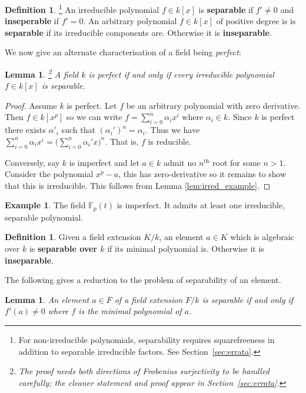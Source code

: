 \documentclass[12pt]{article}
\theoremstyle{plain}
\newtheorem{lemma}[thm]{Lemma}
\theoremstyle{definition}
\newtheorem{defn}[thm]{Definition} %
\newtheorem{example}[thm]{Example}
\newcommand{\bb}[1]{\mathbb{#1}}
\begin{document}
\begin{defn}\label{def:separable_irred_poly}\footnote{For non-irreducible polynomials, separability requires squarefreeness in addition to separable irreducible factors. See Section~\ref{sec:errata}.}
An irreducible polynomial $f \in k[x]$ is \textbf{separable} if $f' \neq 0$ and \textbf{inseperable} if $f' = 0$. An arbitrary polynomial $f \in k[x]$ of positive degree is is \textbf{separable} if its irreducible components are. Otherwise it is \textbf{inseparable}. 
\end{defn}
We now give an alternate characterisation of a field being \emph{perfect}:
\begin{lemma}
\label{lem:perf_alt_defn}\footnote{The proof needs both directions of Frobenius surjectivity to be handled carefully; the cleaner statement and proof appear in Section~\ref{sec:errata}.}
A field $k$ is perfect if and only if every irreducible polynomial $f \in k[x]$ is separable.
\end{lemma}
\begin{proof}
Assume $k$ is perfect. Let $f$ be an arbitrary polynomial with zero derivative. Then $f \in k[x^p]$ so we can write $f = \sum_{i = 0}^n \alpha_i x^i$ where $\alpha_i \in k$. Since $k$ is perfect there exists $\alpha'_i$ such that $(\alpha_i')^n = \alpha_i$. Thus we have $\sum_{i = 0}^n \alpha_i x^i = \big(\sum_{i = 0}^n \alpha_i' x\big)^n$. That is, $f$ is reducible.

Conversely, say $k$ is imperfect and let $a \in k$ admit no $n^\text{th}$ root for some $n > 1$. Consider the polynomial $x^p - a$, this has zero-derivative so it remains to show that this is irreducible. This follows from Lemma \ref{lem:irred_example}.
\end{proof}
\begin{example}
\label{ex:imperfect} The field $\bb{F}_p(t)$ is imperfect. It admits at least one irreducible, separable polynomial.
\end{example}
%
\begin{defn}\label{def:separable_element}
Given a field extension $K/k$, an element $a \in K$ which is algebraic over $k$ is \textbf{separable over $k$} if its minimal polynomial is. Otherwise it is \textbf{inseparable}.
\end{defn}
The following gives a reduction to the problem of separability of an element.
\begin{lemma}
\label{lem:sep_elt_alt_def}
An element $a \in F$ of a field extension $F/k$ is separable if and only if $f'(a) \neq 0$ where $f$ is the minimal polynomial of $a$.
\end{lemma}
\end{document}
